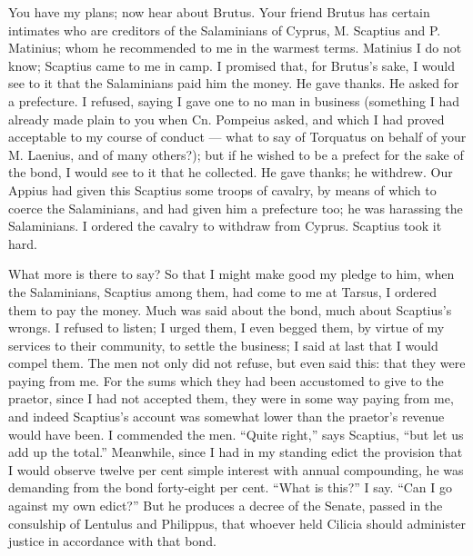  You have my plans; now hear about Brutus. Your friend Brutus has certain intimates who are creditors of the Salaminians of Cyprus, M. Scaptius and P. Matinius; whom he recommended to me in the warmest terms. Matinius I do not know; Scaptius came to me in camp. I promised that, for Brutus's sake, I would see to it that the Salaminians paid him the money. He gave thanks. He asked for a prefecture. I refused, saying I gave one to no man in business (something I had already made plain to you when Cn. Pompeius asked, and which I had proved acceptable to my course of conduct --- what to say of Torquatus on behalf of your M. Laenius, and of many others?); but if he wished to be a prefect for the sake of the bond, I would see to it that he collected. He gave thanks; he withdrew. Our Appius had given this Scaptius some troops of cavalry, by means of which to coerce the Salaminians, and had given him a prefecture too; he was harassing the Salaminians. I ordered the cavalry to withdraw from Cyprus. Scaptius took it hard.

 What more is there to say? So that I might make good my pledge to him, when the Salaminians, Scaptius among them, had come to me at Tarsus, I ordered them to pay the money. Much was said about the bond, much about Scaptius's wrongs. I refused to listen; I urged them, I even begged them, by virtue of my services to their community, to settle the business; I said at last that I would compel them. The men not only did not refuse, but even said this: that they were paying from me. For the sums which they had been accustomed to give to the praetor, since I had not accepted them, they were in some way paying from me, and indeed Scaptius's account was somewhat lower than the praetor's revenue would have been. I commended the men. ``Quite right,'' says Scaptius, ``but let us add up the total.'' Meanwhile, since I had in my standing edict the provision that I would observe twelve per cent simple interest with annual compounding, he was demanding from the bond forty-eight per cent. ``What is this?'' I say. ``Can I go against my own edict?'' But he produces a decree of the Senate, passed in the consulship of Lentulus and Philippus, that whoever held Cilicia should administer justice in accordance with that bond.


